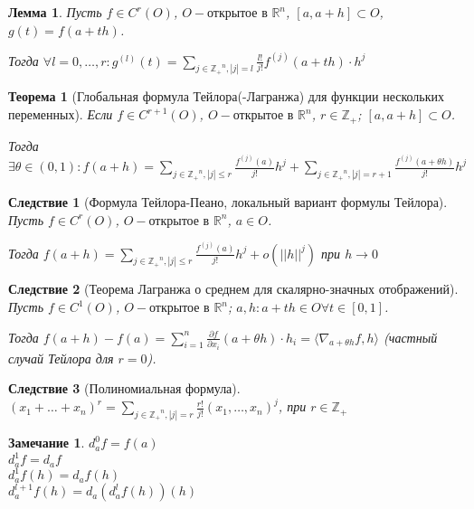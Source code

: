 \documentclass[11pt,a4paper,oneside]{scrartcl}
\newtheorem{lemma}{Лемма}
\newtheorem{theorem}{Теорема}
\newtheorem{consequence}{Следствие}
\newtheorem*{remark}{Замечание}
\begin{document}
\begin{lemma}
    Пусть $f \in C^r (O)$, $O - \text{открытое в } \mathbb{R}^n$, $[a, a+h] \subset O$,
    $g(t) = f(a + th)$.

    Тогда $\forall l = 0, \dots, r :
        g^{(l)} (t) = \sum_{j \in \mathbb{Z_+}^n, |j| = l} \frac{l!}{j!} f^{(j)} (a + th) \cdot h^j$
\end{lemma}

\begin{theorem}[Глобальная формула Тейлора(-Лагранжа) для функции нескольких переменных]
    Если $f \in C^{r+1} (O)$, $O - \text{открытое в } \mathbb{R}^n$, $r \in \mathbb{Z_+}$;
    $[a, a+h] \subset O$.

    Тогда $\exists \theta \in (0, 1):
        f(a+h) = \sum_{j \in \mathbb{Z_+}^n, |j| \leq r} \frac{f^{(j)} (a)}{j!} h^j
        + \sum_{j \in \mathbb{Z_+}^n, |j| = r+1} \frac{f^{(j)} (a + \theta h)}{j!} h^j$
\end{theorem}

\begin{consequence}[Формула Тейлора-Пеано, локальный вариант формулы Тейлора]
    Пусть $f \in C^r (O)$, $O - \text{открытое в } \mathbb{R}^n$, $a \in O$.

    Тогда $f(a+h) = \sum_{j \in \mathbb{Z_+}^n, |j| \leq r} \frac{f^{(j)} (a)}{j!} h^j
    + o(||h||^j)$ при $h \rightarrow 0$
\end{consequence}

\begin{consequence}[Теорема Лагранжа о среднем для скалярно-значных отображений]
    Пусть $f \in C^1 (O)$, $O - \text{открытое в } \mathbb{R}^n$;
    $a, h: a+th \in O \forall t \in [0, 1]$.

    Тогда $f(a+h) - f(a) = \sum_{i=1}^n \frac{\partial f}{\partial x_i} (a + \theta h) \cdot h_i
        = \langle \nabla_{a + \theta h} f, h \rangle$ (частный случай Тейлора для $r = 0$).
\end{consequence}

\begin{consequence}[Полиномиальная формула]
    $(x_1 + \dots + x_n)^r = \sum_{j \in \mathbb{Z_+}^n, |j| = r} \frac{r!}{j!} (x_1, \dots, x_n)^j$,
    при $r \in \mathbb{Z_+}$
\end{consequence}

\begin{remark}
    $d_a^0 f = f(a)$ \\
    $d_a^1 f = d_a f$ \\
    $d_a^1 f(h) = d_a f(h)$ \\
    $d_a^{l+1} f(h) = d_a (d_a^l f(h)) (h)$
\end{remark}
\end{document}
